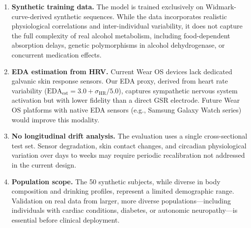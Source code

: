 \documentclass[HARVARD,Times2COL]{WileyNJDv5} %
\providecommand{\DIFadd}[1]{{\protect\color{red} #1}} %
\begin{document}
\begin{enumerate}
\item \DIFadd{\textbf{Synthetic training data.} The model is trained exclusively on Widmark-curve-derived synthetic sequences. While the data incorporates realistic physiological correlations and inter-individual variability, it does not capture the full complexity of real alcohol metabolism, including food-dependent absorption delays, genetic polymorphisms in alcohol dehydrogenase, or concurrent medication effects.
}

\item \DIFadd{\textbf{EDA estimation from HRV.} Current Wear OS devices lack dedicated galvanic skin response sensors. Our EDA proxy, derived from heart rate variability ($\text{EDA}_{\text{est}} = 3.0 + \sigma_{\text{HR}} / 5.0$), captures sympathetic nervous system activation but with lower fidelity than a direct GSR electrode. Future Wear OS platforms with native EDA sensors (e.g., Samsung Galaxy Watch series) would improve this modality.
}

\item \DIFadd{\textbf{No longitudinal drift analysis.} The evaluation uses a single cross-sectional test set. Sensor degradation, skin contact changes, and circadian physiological variation over days to weeks may require periodic recalibration not addressed in the current design.
}

\item \DIFadd{\textbf{Population scope.} The 50 synthetic subjects, while diverse in body composition and drinking profiles, represent a limited demographic range. Validation on real data from larger, more diverse populations---including individuals with cardiac conditions, diabetes, or autonomic neuropathy---is essential before clinical deployment.
}\end{enumerate}
\end{document}
